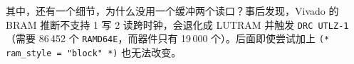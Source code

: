 \documentclass[withoutpreface,bwprint]{cumcmthesis}
\begin{document}
其中，还有一个细节，为什么没用一个缓冲两个读口？事后发现，Vivado 的 BRAM 推断不支持 1 写 2 读跨时钟，会退化成 LUTRAM 并触发 \texttt{DRC UTLZ-1}（需要 86\,452 个 \texttt{RAMD64E}，而器件只有 19\,000 个）。后面即使尝试加上 \texttt{(* ram\_style = "block" *)} 也无法改变。

%
%
%
\end{document}
